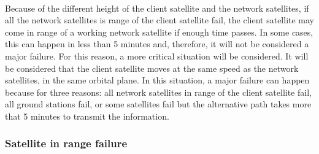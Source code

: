 \paragraph{}Because of the different height of the client satellite and the network satellites, if all the network satellites is range of the client satellite fail, the client satellite may come in range of a working network satellite if enough time passes. In some cases, this can happen in less than 5 minutes and, therefore, it will not be considered a major failure. For this reason, a more critical situation will be considered. It will be considered that the client satellite moves at the same speed as the network satellites, in the same orbital plane. In this situation, a major failure can happen because for three reasons: all network satellites in range of the client satellite fail, all ground stations fail, or some satellites fail but the alternative path takes more that 5 minutes to transmit the information.

\subsubsection{Satellite in range failure}

